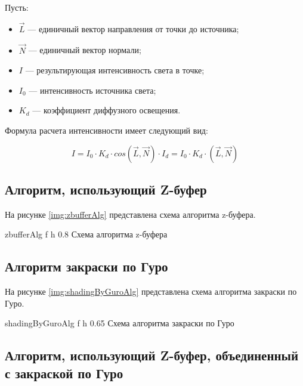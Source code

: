 Пусть:
\begin{itemize}
	\item $\vec{L}$ --- единичный вектор направления от точки до источника;
	\item $\vec{N}$ --- единичный вектор нормали;
	\item $I$ --- результирующая интенсивность света в точке;
	\item $I_0$ --- интенсивность источника света;
	\item $K_d$ --- коэффициент диффузного освещения.
\end{itemize}

Формула расчета интенсивности имеет следующий вид:

\begin{equation}
	\label{equ:lambert}
	I = I_0 \cdot K_d \cdot cos(\vec{L}, \vec{N}) \cdot I_d = I_0 \cdot K_d \cdot (\vec{L}, \vec{N})
\end{equation}


\subsection{Алгоритм, использующий Z-буфер}

На рисунке \ref{img:zbufferAlg} представлена схема алгоритма  z-буфера.

{zbufferAlg} %
{f} %
{h} %
{0.8\textwidth} %
{Схема алгоритма z-буфера} %

\clearpage

\subsection{Алгоритм закраски по Гуро}

На рисунке \ref{img:shadingByGuroAlg} представлена схема алгоритма закраски по Гуро.

{shadingByGuroAlg} %
{f} %
{h} %
{0.65\textwidth} %
{Схема алгоритма закраски по Гуро} %

\clearpage

\subsection{Алгоритм, использующий Z-буфер, объединенный с закраской по Гуро}

